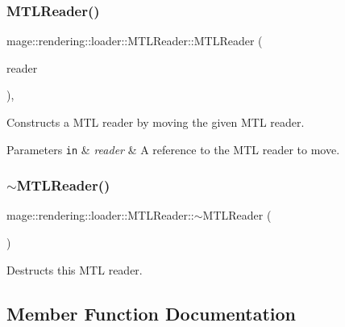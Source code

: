 \subsubsection{\texorpdfstring{M\+T\+L\+Reader()}{MTLReader()}\hspace{0.1cm}{\footnotesize\ttfamily [3/3]}}
{\footnotesize\ttfamily mage\+::rendering\+::loader\+::\+M\+T\+L\+Reader\+::\+M\+T\+L\+Reader (\begin{DoxyParamCaption}\item[{\hyperlink{classmage_1_1rendering_1_1loader_1_1_m_t_l_reader}{M\+T\+L\+Reader} \&\&}]{reader }\end{DoxyParamCaption})\hspace{0.3cm}{\ttfamily [default]}, {\ttfamily [noexcept]}}

Constructs a M\+TL reader by moving the given M\+TL reader.


\begin{DoxyParams}[1]{Parameters}
\mbox{\tt in}  & {\em reader} & A reference to the M\+TL reader to move. \\
\hline
\end{DoxyParams}
\hypertarget{classmage_1_1rendering_1_1loader_1_1_m_t_l_reader_a87a4f9bf27cfe8e7e7d0c13c330775d6}{}\label{classmage_1_1rendering_1_1loader_1_1_m_t_l_reader_a87a4f9bf27cfe8e7e7d0c13c330775d6} 
\subsubsection{\texorpdfstring{$\sim$\+M\+T\+L\+Reader()}{~MTLReader()}}
{\footnotesize\ttfamily mage\+::rendering\+::loader\+::\+M\+T\+L\+Reader\+::$\sim$\+M\+T\+L\+Reader (\begin{DoxyParamCaption}{ }\end{DoxyParamCaption})\hspace{0.3cm}{\ttfamily [default]}}

Destructs this M\+TL reader. 

\subsection{Member Function Documentation}
\hypertarget{classmage_1_1rendering_1_1loader_1_1_m_t_l_reader_a1153606ce103d9f667726cf5f66a88d1}{}\label{classmage_1_1rendering_1_1loader_1_1_m_t_l_reader_a1153606ce103d9f667726cf5f66a88d1} 
